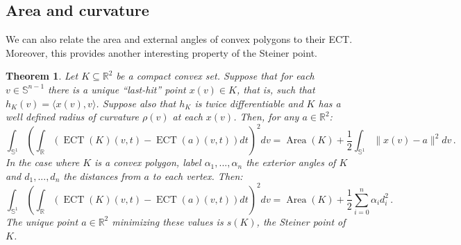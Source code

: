 \documentclass[a4paper]{article}
\newtheorem{theorem}{Theorem}[section]
\newcommand{\ECT}{\operatorname{ECT}}
\newcommand{\bb}{\mathbb}
\begin{document}
\subsection{Area and curvature}

We can also relate the area and external angles of convex polygons to their ECT. Moreover, this provides another interesting property of the Steiner point.

\begin{theorem}
	\label{Area}
	Let $K \subseteq \bb R^2$ be a compact convex set. Suppose that for each $v\in \bb S^{n-1}$ there is a unique ``last-hit'' point $x(v)\in K$, that is, such that $h_K(v)=\langle x(v), v \rangle$. Suppose also that $h_K$ is twice differentiable and $K$ has a well defined radius of curvature $\rho(v)$ at each $x(v)$. Then, for any $a \in \bb R^2$:
	\[ \int_{\bb S^{1}} \left(\int_{\bb R} (\ECT(K)(v,t)-\ECT(a)(v,t)) dt \right)^2 dv= \operatorname{Area}(K)+\frac{1}{2}\int_{\bb S^{1}} \|x(v)-a\|^2  dv \, .\]
	In the case where $K$ is a convex polygon, label $\alpha_1,...,\alpha_n$ the exterior angles of $K$ and $d_1,...,d_n$ the distances from $a$ to each vertex. Then:
	\[ \int_{\bb S^{1}} \left(\int_{\bb R} (\ECT(K)(v,t)-\ECT(a)(v,t)) dt \right)^2 dv=\operatorname{Area}(K)+\frac{1}{2}\sum_{i=0}^n \alpha_i d_i^2\, .  \]
	The unique point $a\in \bb R^2$ minimizing these values is $s(K)$, the Steiner point of $K$.
\end{theorem}
\end{document}
